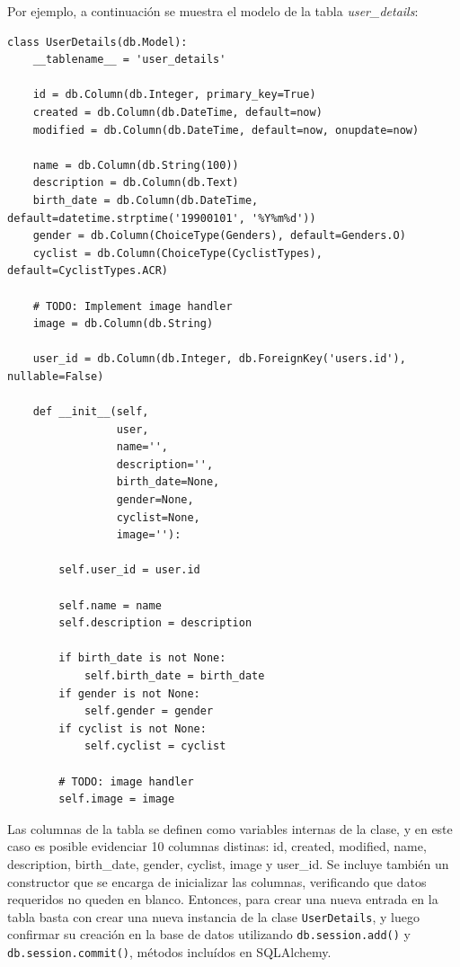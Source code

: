 \documentclass[11pt,letterpaper]{article}
\begin{document}
Por ejemplo, a continuación se muestra el modelo de la tabla \emph{user\_details}:
\begin{lstlisting}[title=Modelo de la tabla \emph{user\_details}]
class UserDetails(db.Model):
    __tablename__ = 'user_details'

    id = db.Column(db.Integer, primary_key=True)
    created = db.Column(db.DateTime, default=now)
    modified = db.Column(db.DateTime, default=now, onupdate=now)

    name = db.Column(db.String(100))
    description = db.Column(db.Text)
    birth_date = db.Column(db.DateTime, default=datetime.strptime('19900101', '%Y%m%d'))
    gender = db.Column(ChoiceType(Genders), default=Genders.O)
    cyclist = db.Column(ChoiceType(CyclistTypes), default=CyclistTypes.ACR)

    # TODO: Implement image handler
    image = db.Column(db.String)

    user_id = db.Column(db.Integer, db.ForeignKey('users.id'), nullable=False)

    def __init__(self,
                 user,
                 name='',
                 description='',
                 birth_date=None,
                 gender=None,
                 cyclist=None,
                 image=''):

        self.user_id = user.id

        self.name = name
        self.description = description

        if birth_date is not None:
            self.birth_date = birth_date
        if gender is not None:
            self.gender = gender
        if cyclist is not None:
            self.cyclist = cyclist

        # TODO: image handler
        self.image = image
\end{lstlisting}

Las columnas de la tabla se definen como variables internas de la clase, y en este caso es posible evidenciar 10 columnas distinas: id, created, modified, name, description, birth\_date, gender, cyclist, image y user\_id. Se incluye también un constructor que se encarga de inicializar las columnas, verificando que datos requeridos no queden en blanco. Entonces, para crear una nueva entrada en la tabla basta con crear una nueva instancia de la clase \texttt{UserDetails}, y luego confirmar su creación en la base de datos utilizando \texttt{db.session.add()} y \texttt{db.session.commit()}, métodos incluídos en SQLAlchemy.\\
\end{document}
